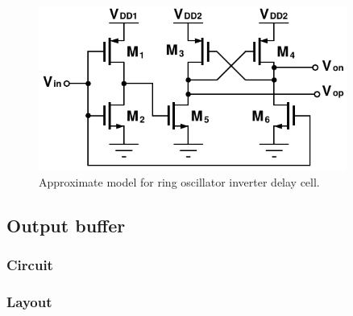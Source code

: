 			\begin{figure}[htb!]
			        \centering
			        \includegraphics[width=0.9\textwidth, angle=0]{./figs/design/level_shift}
			    \caption{Approximate model for ring oscillator inverter delay cell.}
			    \label{fig:level_shifter}
			\end{figure}




	\FloatBarrier
	\subsection{Output buffer}
		\subsubsection{Circuit}
		\subsubsection{Layout}


